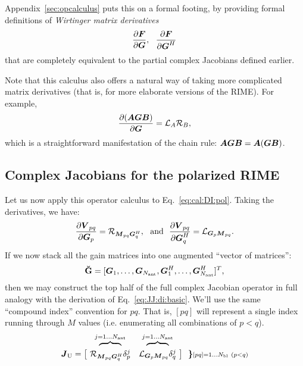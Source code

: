 \documentclass[useAMS,usenatbib]{mn2e}
\newcommand{\mat}[1]{{\bmath{#1}}}
\newcommand{\JJ}{\mat{J}} %
\newcommand{\MM}{\mat{M}}
\newcommand{\VV}{\mat{V}}
\newcommand{\GG}{\mat{G}}
\newcommand{\AUGx}[1]{\mathbf{\breve{#1}}}
\newcommand{\GGg}{\AUGx{G}}
\newcommand{\TOP}{\mathrm{U}}%
\newcommand{\Rop}[1]{\mathcal{R}_{{#1}}}
\newcommand{\Lop}[1]{\mathcal{L}_{{#1}}}
\numberwithin{equation}{section}
\providecommand{\DIFaddend}{} %
\begin{document}
Appendix~\ref{sec:opcalculus} puts this on a formal footing, by providing formal definitions of \emph{Wirtinger matrix derivatives}
\begin{equation}
\frac{\partial\mat{F}}{\partial{\mat{G}}}, ~~
\frac{\partial\mat{F}}{\partial{\mat{G}^H}} 
\end{equation}
that are completely equivalent to the partial complex Jacobians defined earlier. 

Note that this calculus also offers a natural way of taking more
complicated matrix derivatives (that is, for more elaborate versions of the RIME). For example,
\begin{equation}
\frac{\partial(\mat{AGB})}{\partial{\mat{G}}} = \Lop{A}\Rop{B},
\end{equation}
which is a straightforward manifestation of the chain rule: $\mat{AGB}=\mat{A}(\mat{GB})$.


\subsection{Complex Jacobians for the polarized RIME}

Let us now apply this operator calculus to Eq.~\ref{eq:cal:DI:pol}. Taking the derivatives, we have:
\begin{equation}
\label{eq:dR:dG}
\frac{\partial\VV_{pq}}{\partial\GG_p} = \Rop{\MM_{pq}\GG^H_q},\mathrm{~~and~~}
\frac{\partial\VV_{pq}}{\partial\GG^H_q} = \Lop{\GG_p \MM_{pq}}.
\end{equation}
If we now stack all the gain matrices into one augmented ``vector of matrices'':
\begin{equation}
\label{eq:GGvec}
\GGg = [ \GG_1,\dots,\GG_{\scriptstyle \Na},\GG^H_1,\dots,\GG^H_{\scriptstyle \Na} ]^T,
\end{equation}
then we may construct the top half of the full complex Jacobian operator in full analogy with the 
derivation of Eq.~\ref{eq:JJ:di:basic}. We'll use the same ``compound index'' convention for $pq$. That is, 
$[pq]$ will represent a single index running through $M$ values (i.e. enumerating all combinations of $p<q$).
\begin{equation}
\label{eq:JJtop}
\begin{array}{r@{~}cc@{~}cc}
  & \overbrace{~~~~~~~~}^{j=1\dots \Na} & \overbrace{~~~~~~~~}^{j=1\dots \Na} \\

\JJ_\TOP = \big [ & 
\Rop{ \MM_{pq}\GG^H_q }\delta^j_p & 
\Lop{ \GG_p \MM_{pq}  }\delta^j_q 
& \big ] ~~ \bm{\}} \DIFaddend \scriptstyle [pq]=1\dots \Nbl~(p<q)
% 
\end{array}
\end{equation}
\end{document}
